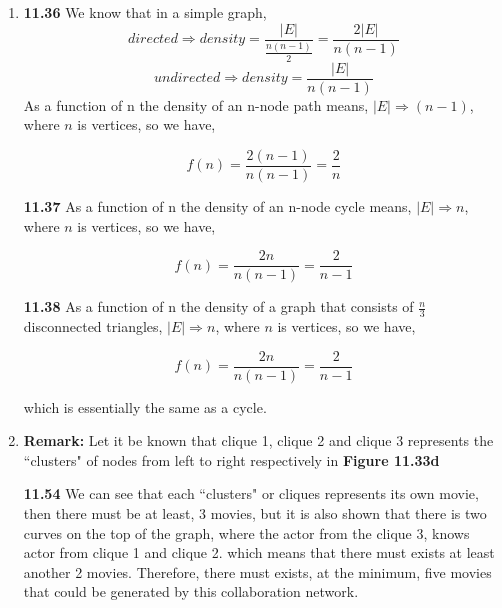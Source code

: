 \documentclass[12pt]{article}
\begin{document}
\begin{enumerate}[label=Part \Alph*)]
\begin{proof}[Proof]
		$(1, n + 1) \leftarrow (2, n + 1) \leftarrow \ldots \leftarrow (n + 1, n + 1)$
		
		
		By this visual, we can clearly see that whenever $r \in \mathbb{Z}_{\text{odd}}$, it will be making a downwards movement, so since $(n + 1) \in \mathbb{Z}_{\text{odd}}^{+}$, we know that $n \in \mathbb{Z}_{\text{even}}^{+}$, that means that it will be making an upwards movement so that it can turn right towards $(n + 1, 1)$ where it can start moving down again. Note that we have never really visited $c = n + 1$ for these traversal, so let it be known that, after reaching $(n + 1, n + 1)$, it can go directly to $(1, n+1)$, where the rook will be at the bottom-left of the chessboard.
        
        $\therefore$ It must be true that the rook's tour exists for an $n \times n$ chessboard, for some $n \in \mathbb{Z}^{+}$.
        
    \end{proof}
    
    \item \textbf{11.36} We know that in a simple graph,
	$$directed \Rightarrow density = \frac{|E|}{\frac{n(n-1)}{2}} = \frac{2|E|}{n(n-1)}$$
	$$undirected \Rightarrow density =  \frac{|E|}{n(n-1)}$$
	As a function of n the density of an n-node path means, $|E| \Rightarrow (n - 1)$, where $n$ is vertices, so we have,
	
	$$f(n) = \frac{2(n-1)}{n(n-1)} = \frac{2}{n}$$
	
	\textbf{11.37} As a function of n the density of an n-node cycle means, $|E| \Rightarrow n$, where $n$ is vertices, so we have,
	
	$$f(n) = \frac{2n}{n(n-1)} = \frac{2}{n - 1}$$
	
	\textbf{11.38} As a function of n the density of a graph that consists of $\frac{n}{3}$ disconnected triangles, $|E| \Rightarrow n$, where $n$ is vertices, so we have,
	
	$$f(n) = \frac{2n}{n(n-1)} = \frac{2}{n - 1}$$
	
	which is essentially the same as a cycle.
		
	\item \textbf{Remark:} Let it be known that clique 1, clique 2 and clique 3 represents the ``clusters" of nodes from left to right respectively in \textbf{Figure 11.33d}
	
	\textbf{11.54} We can see that each ``clusters" or cliques represents its own movie, then there must be at least, 3 movies, but it is also shown that there is two curves on the top of the graph, where the actor from the clique 3, knows actor from clique 1 and clique 2. which means that there must exists at least another 2 movies. Therefore, there must exists, at the minimum, five movies that could be generated by this collaboration network.
	

\end{enumerate}
\end{document}
